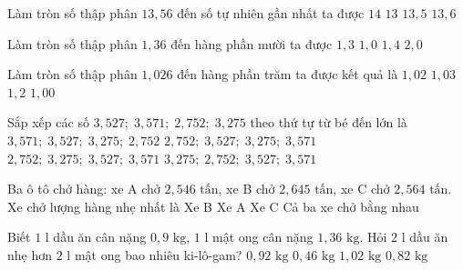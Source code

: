 \begin{ex} %
Làm tròn số thập phân $13{,}56$ đến số tự nhiên gần nhất ta được
\choice
{\True $14$}
{$13$}
{$13{,}5$}
{$13{,}6$}
\end{ex}

\begin{ex} %
Làm tròn số thập phân $1{,}36$ đến hàng phần mười ta được
\choice
{$1{,}3$}
{$1{,}0$}
{\True $1{,}4$}
{$2{,}0$}
\end{ex}

\begin{ex} %
Làm tròn số thập phân $1{,}026$ đến hàng phần trăm ta được kết quả là
\choice
{$1{,}02$}
{\True $1{,}03$}
{$1{,}2$}
{$1{,}00$}
\end{ex}

\begin{ex} %
Sắp xếp các số $3{,}527;\; 3{,}571;\; 2{,}752;\; 3{,}275$ theo thứ tự từ bé đến lớn là
\choice
{$3{,}571;\; 3{,}527;\; 3{,}275;\; 2{,}752$}
{$2{,}752;\; 3{,}527;\; 3{,}275;\; 3{,}571$}
{\True $2{,}752;\; 3{,}275;\; 3{,}527;\; 3{,}571$}
{$3{,}275;\; 2{,}752;\; 3{,}527;\; 3{,}571$}
\end{ex}

\begin{ex} %
Ba ô tô chở hàng: xe A chở $2{,}546\text{ tấn}$, xe B chở $2{,}645\text{ tấn}$, xe C chở $2{,}564\text{ tấn}$. Xe chở lượng hàng nhẹ nhất là
\choice
{Xe B}
{\True Xe A}
{Xe C}
{Cả ba xe chở bằng nhau}
\end{ex}

\begin{ex} %
Biết $1\text{ l}$ dầu ăn cân nặng $0{,}9\text{ kg}$, $1\text{ l}$ mật ong cân nặng $1{,}36\text{ kg}$. Hỏi $2\text{ l}$ dầu ăn nhẹ hơn $2\text{ l}$ mật ong bao nhiêu ki-lô-gam?
\choice
{\True $0{,}92\text{ kg}$}
{$0{,}46\text{ kg}$}
{$1{,}02\text{ kg}$}
{$0{,}82\text{ kg}$}
\end{ex}

